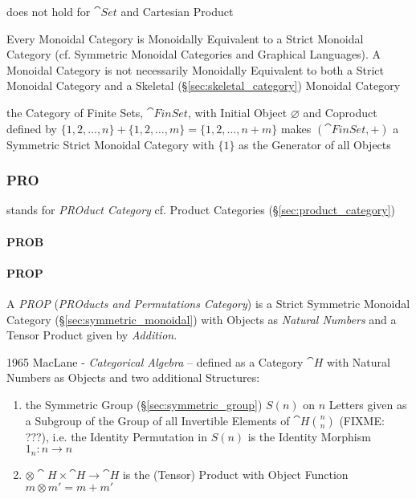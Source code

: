 does not hold for $\cat{Set}$ and Cartesian Product

Every Monoidal Category is Monoidally Equivalent to a Strict Monoidal
Category (cf. Symmetric Monoidal Categories and Graphical Languages).
A Monoidal Category is not necessarily Monoidally Equivalent to both a
Strict Monoidal Category and a Skeletal
(\S\ref{sec:skeletal_category}) Monoidal Category

the Category of Finite Sets, $\cat{FinSet}$, with Initial Object $\varnothing$
and Coproduct defined by $\{1,2,\ldots,n\} + \{1,2,\ldots,m\} =
\{1,2,\ldots,n+m\}$ makes $(\cat{FinSet}, +)$ a
Symmetric Strict Monoidal Category with $\{1\}$ as the Generator of all Objects



\subsubsection{PRO}\label{sec:pro_category}

stands for \emph{PROduct Category} \fist cf. Product Categories
(\S\ref{sec:product_category})



\paragraph{PROB}\label{sec:prob_category}\hfill

\paragraph{PROP}\label{sec:prop_category}\hfill

A \emph{PROP} (\emph{PROducts and Permutations Category}) is a Strict Symmetric
Monoidal Category (\S\ref{sec:symmetric_monoidal}) with Objects as
\emph{Natural Numbers} and a Tensor Product given by \emph{Addition}.

1965 MacLane - \emph{Categorical Algebra} -- defined as a Category $\cat{H}$
with Natural Numbers as Objects and two additional Structures:
\begin{enumerate}
  \item the Symmetric Group (\S\ref{sec:symmetric_group}) $S(n)$ on $n$ Letters
    given as a Subgroup of the Group of all Invertible Elements of
    $\cat{H}\binom{n}{n}$ (FIXME: ???), i.e. the Identity Permutation in $S(n)$
    is the Identity Morphism $1_n : n \rightarrow n$
  \item $\otimes \cat{H} \times \cat{H} \rightarrow \cat{H}$ is the (Tensor)
    Product with Object Function $m \otimes m' = m + m'$
\end{enumerate}

